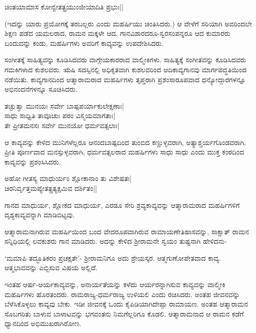 \begin{shloka} 
ಚಿಂತಯಾಮಾಸ ಕೋನ್ವೇತತ್ಪ್ರಯುಂಜೀಯಾದಿತಿ ಪ್ರಭುಃ||\label{158a}
\end{shloka} 

(ಇದನ್ನು ಯಾರು ಪ್ರಯೋಗಕ್ಕೆ ತರಬಲ್ಲರು ಎಂದು ಮಹರ್ಷಿಯು ಚಿಂತಿಸಿದರು.) ಆ ವೇಳೆಗೆ ಸರಿಯಾಗಿ ಅವರಿಂದಲೇ ಶಿಕ್ಷಣ ಪಡೆದ ಯಮಲರಾದ, ರಾಮನ ಮಕ್ಕಳೇ ಆದ, ಗಾನವಿಶಾರದರೂ-ಸ್ವರಸಂಪನ್ನರೂ ಆದ ಕುಮಾರರು ಬಂದುದನ್ನು ಕಂಡು, ಮಹರ್ಷಿಗಳು ಅವರಿಗೆ ಕಾವ್ಯವನ್ನು ಉಪದೇಶಿಸಿದರು. 

ಸಂಗೀತಕ್ಕೆ ಸಾಹಿತ್ಯವನ್ನು ಕೂಡಿಸಿದವರು ವಾಗ್ಗೇಯಕಾರರಾದ ವಾಲ್ಮೀಕಿಗಳು. ಸಾಹಿತ್ಯಕ್ಕೆ ಸಂಗೀತವನ್ನು ಕೂಡಿಸಿದವರು ಗಮಕಿಗಳಾದ ಕುಶಲವರು. ಋಷಿ ಸದಸ್ಸಿನಲ್ಲಿ ಅಧಿಕೃತವಾಗಿ ಕುಶಲವರಿಂದ ಆದಿಕಾವ್ಯಗಾನವು ಮಾರ್ಗಪದ್ಧತಿಯಿಂದ ನಡೆಯಿತು. ಕಾವ್ಯಗಾನದಿಂದ ಆತ್ಮಾರಾಮರಾದ ಮಹರ್ಷಿಗಳು ತೃಪ್ತರಾಗಿ ಪ್ರಶಂಸಾರೂಪವಾದ ಧನ್ಯೋದ್ಗಾರಗಳನ್ನೂ ಅಭಿನಂದನೆಗಳನ್ನೂ ಸೂಚಿಸಿದರು. 

\begin{shloka} 
ತಚ್ಘುತ್ವಾ ಮುನಯಃ ಸರ್ವೇ ಬಾಷ್ಪಪರ್ಯಾಕುಲೇಕ್ಷಣಾಃ|\label{158}\\ 
ಸಾಧು ಸಾಧ್ವಿತಿ ತಾವೂಚುಃ ಪರಂ ವಿಸ್ಮಯಮಾಗತಾಃ|\\ 
ತೇ ಪ್ರೀತಮನಸಃ ಸರ್ವೇ ಮುನಯೋ ಧರ್ಮವತ್ಸಲಾಃ|
\end{shloka} 

ಆ ಕಾವ್ಯವನ್ನು ಕೇಳಿದ ಮುನಿಗಳೆಲ್ಲರೂ ಆನಂದಬಾಷ್ಪದಿಂದ ತುಂಬಿದ ಕಣ್ಣುಳ್ಳವರಾಗಿ, ಅತ್ಯಾಶ್ಚರ್ಯಗೊಂಡವರಾಗಿ, ಪ್ರೀತಿ ಪೂರ್ಣವಾದ ಮನಸ್ಸುಳ್ಳವರಾಗಿ, ಧರ್ಮವತ್ಸಲರಾದ ಮಹರ್ಷಿಗಳು ಸಾಧು ಸಾಧು ಎಂದು ಮುಕ್ತ ಕಂಠದಿಂದ ಕಾವ್ಯವನ್ನು ಪ್ರಶಂಸಿಸಿದರು. 

\begin{shloka} 
ಅಹೋ ಗೀತಸ್ಯ ಮಾಧುರ್ಯಂ ಶ್ಲೋಕಾನಾಂ ತು ವಿಶೇಷತಃ|\label{159}\\ 
ಚಿರನಿರ್ವೃತ್ತಮಪ್ಯೇತತ್ಪ್ರತ್ಯಕ್ಷಮಿವ ದರ್ಶಿತಂ||
\end{shloka} 

ಗಾನದ ಮಾಧುರ್ಯ, ಶ್ಲೋಕದ ಮಾಧುರ್ಯ, ಎರಡೂ ಸೇರಿ ಶ್ರವ್ಯಕಾವ್ಯವನ್ನು ಆತ್ಮಾರಾಮರಾದ ಮಹರ್ಷಿಗಳಿಗೆ ದೃಶ್ಯಕಾವ್ಯವನ್ನಾಗಿ ಮಾಡಿಬಿಟ್ಟವು. 

ಆತ್ಮಾರಾಮನಾಗಿರುವ ಮಹರ್ಷಿಯಿಂದ ಬಂದ ವೇದರೂಪವಾಗಿರುವ ರಾಮಾಯಣೇತಿಹಾಸವನ್ನು, ಸಾಕ್ಷಾತ್‍ ರಾಮನ ಸನ್ನಿಧಿಯಲ್ಲಿ ಲವಕುಶರು ಗಾನ ಮಾಡಿದರು. ಅದನ್ನು ಕೇಳಿದ ಶ್ರೀರಾಮನೇ ಸ್ವಯಂ ತುಷ್ಟನಾಗಿ ಹೇಳಿದನು- 

`ಮಮಾಪಿ ತದ್ಭೂತಿಕರಂ ಪ್ರಚಕ್ಷತೇ'-\label{159a} ಶ್ರೀರಾಮನಿಗೂ ಅದು ಶ್ರೇಯಸ್ಕರ. ಆತ್ಮಗುಣೋಪೇತವಾದ ಕಾವ್ಯ. ಆತ್ಮಭಾವವನ್ನು ಎಬ್ಬಿಸುವ ವಿಷಯ ಅಲ್ಲಿದೆ. 

ಇಂತಹ ಆರ್ಷ-ಆರ್ಯಕಾವ್ಯವನ್ನು, ಅನಾರ್ಯತೆಯನ್ನು ಕಳೆದು ಆರ್ಯರನ್ನಾಗಿಸುವ ಕಾವ್ಯವನ್ನು ವಾಲ್ಮೀಕಿ ಮಹರ್ಷಿಗಳು ಹೊರತಂದರು. ರಾಮರಾಜ್ಯ-ಧರ್ಮರಾಜ್ಯ ಉಳಿಯಲಿ ಎಂದು ರಚಿಸಿದರು. ಅಂತಹ ಜೀವನವನ್ನು ಬೆಳೆಸಿಕೊಳ್ಳಲು ಕಾವ್ಯವು ಬೇಕು. ಇಡೀ ಜೀವನಕ್ಕೆ ಒಂದು ಕೈಪಿಡಿಯಾಗಿದೇಪ್ಪಾ ರಾಮಾಯಣ. ಅಂತಹ ಆತ್ಮಾರಾಮನ ಸೊಬಗರಿತು ಬಾಳುವ ಬಾಳಾಟವನ್ನು ಭಗವಂತನು ನಿಮಗೆಲ್ಲರಿಗೂ ಕೊಡಲಿ. ಆತ್ಮಾರಾಮನಾದ ಆ ರಾಮನ ಕಡೆಗೆ ಧ್ಯಾನದಿಂದ ಅಭಿಮುಖರಾಗಿರೋಣ. 
